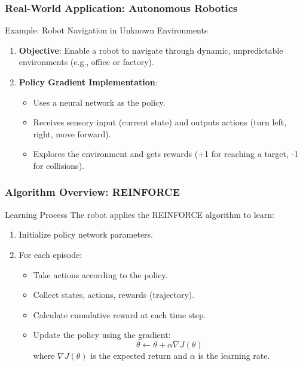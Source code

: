 \documentclass[aspectratio=169]{beamer}
\begin{document}
\begin{frame}[fragile]
    \frametitle{Real-World Application: Autonomous Robotics}
    \begin{block}{Example: Robot Navigation in Unknown Environments}
        \begin{enumerate}
            \item \textbf{Objective}: Enable a robot to navigate through dynamic, unpredictable environments (e.g., office or factory).
            \item \textbf{Policy Gradient Implementation}:
            \begin{itemize}
                \item Uses a neural network as the policy.
                \item Receives sensory input (current state) and outputs actions (turn left, right, move forward).
                \item Explores the environment and gets rewards (+1 for reaching a target, -1 for collisions).
            \end{itemize}
        \end{enumerate}
    \end{block}
\end{frame}

\begin{frame}[fragile]
    \frametitle{Algorithm Overview: REINFORCE}
    \begin{block}{Learning Process}
        The robot applies the REINFORCE algorithm to learn:
        \begin{enumerate}
            \item Initialize policy network parameters.
            \item For each episode:
            \begin{itemize}
                \item Take actions according to the policy.
                \item Collect states, actions, rewards (trajectory).
                \item Calculate cumulative reward at each time step.
                \item Update the policy using the gradient:
                \begin{equation}
                \theta \leftarrow \theta + \alpha \nabla J(\theta)
                \end{equation}
                where \( \nabla J(\theta) \) is the expected return and \( \alpha \) is the learning rate.
            \end{itemize}
        \end{enumerate}
    \end{block}
\end{frame}
\end{document}
